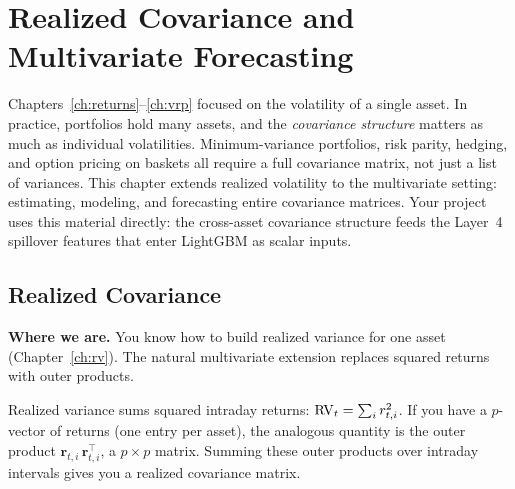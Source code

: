 
\chapter{Realized Covariance and Multivariate Forecasting}\label{ch:multivariate}

\begin{application}
Chapters~\ref{ch:returns}--\ref{ch:vrp} focused on the volatility of a single asset.
In practice, portfolios hold many assets, and the \emph{covariance structure} matters as
much as individual volatilities. Minimum-variance portfolios, risk parity, hedging, and
option pricing on baskets all require a full covariance matrix, not just a list of
variances. This chapter extends realized volatility to the multivariate setting:
estimating, modeling, and forecasting entire covariance matrices. Your
project uses this material directly: the cross-asset covariance structure
feeds the Layer~4 spillover features that enter LightGBM as scalar inputs.
\end{application}

\section{Realized Covariance}\label{sec:multivariate:rc}

\textbf{Where we are.}  You know how to build realized variance for one asset
(Chapter~\ref{ch:rv}). The natural multivariate extension replaces squared returns
with outer products.

\begin{intuition}
Realized variance sums squared intraday returns: $\operatorname{RV}_t = \sum_i r_{t,i}^2$.
If you have a $p$-vector of returns (one entry per asset), the analogous
quantity is the outer product $\mathbf{r}_{t,i}\,\mathbf{r}_{t,i}^\top$,
a $p \times p$ matrix. Summing these outer products over intraday intervals
gives you a realized covariance matrix.
\end{intuition}


